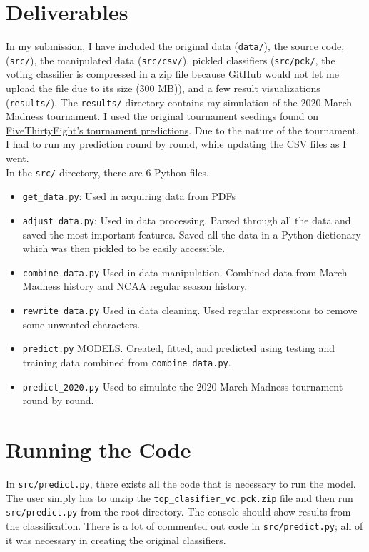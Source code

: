 \documentclass[10pt]{article}
\begin{document}
\section{Deliverables}
    In my submission, I have included the original data (\texttt{data/}), the source code, (\texttt{src/}), the manipulated data (\texttt{src/csv/}), pickled classifiers (\texttt{src/pck/}, the voting classifier is compressed in a zip file because GitHub would not let me upload the file due to its size (\~300 MB)), and a few result visualizations (\texttt{results/}).  The \texttt{results/} directory contains my simulation of the 2020 March Madness tournament.  I used the original tournament seedings found on \href{https://projects.fivethirtyeight.com/2020-march-madness-predictions/}{FiveThirtyEight's tournament predictions}.  Due to the nature of the tournament, I had to run my prediction round by round, while updating the CSV files as I went.\\
    In the \texttt{src/} directory, there are 6 Python files.
    \begin{itemize}
        \item \texttt{get\_data.py}:  Used in acquiring data from PDFs
        \item \texttt{adjust\_data.py}:  Used in data processing. Parsed through all the data and saved the most important features.  Saved all the data in a Python dictionary which was then pickled to be easily accessible.
        \item \texttt{combine\_data.py}  Used in data manipulation.  Combined data from March Madness history and NCAA regular season history.
        \item \texttt{rewrite\_data.py} Used in data cleaning.  Used regular expressions to remove some unwanted characters.
        \item \texttt{predict.py}  MODELS.  Created, fitted, and predicted using testing and training data combined from \texttt{combine\_data.py}.
        \item \texttt{predict\_2020.py}  Used to simulate the 2020 March Madness tournament round by round.
    \end{itemize}

\section{Running the Code}
    In \texttt{src/predict.py}, there exists all the code that is necessary to run the model.  The user simply has to unzip the \texttt{top\_clasifier\_vc.pck.zip} file and then run \texttt{src/predict.py} from the root directory.  The console should show results from the classification.  There is a lot of commented out code in \texttt{src/predict.py}; all of it was necessary in creating the original classifiers.
\end{document}

